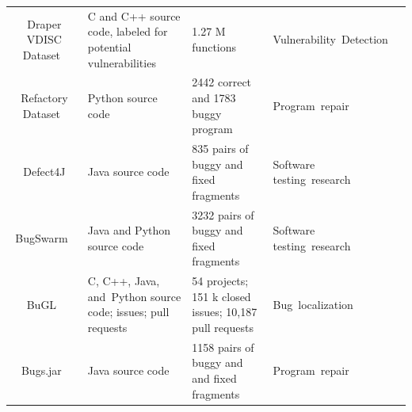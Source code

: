 \documentclass[mathematics,review,accept,moreauthors,pdftex]{Definitions/mdpi}
\begin{document}
\begin{specialtable}[H]
\begin{tabulary}{\textwidth}{CLLLl}
Draper VDISC Dataset~\cite{RusselEtAl2018} & C and C++ source code, labeled for potential vulnerabilities & 1.27 M functions & Vulnerability~Detection \\
Refactory Dataset~\cite{yang2019refactory} & Python source code & 2442 correct and 1783 buggy program & Program~repair \\
\hbox{Defect4J}\cite{just2014defects4j} & Java source code & 835 pairs of buggy and fixed fragments & Software testing~research \\
BugSwarm~\cite{Tomassi2019bugswarm} & Java and Python source code & 3232 pairs of buggy and fixed fragments & Software testing~research \\
BuGL~\cite{muvva2020bugl} & C, C++, Java, and~Python source code; issues; pull requests & 54 projects; 151 k closed issues; 10,187 pull requests & Bug~localization \\
Bugs.jar~\cite{SahaEtAl2018bugsjar} & Java source code & 1158 pairs of buggy and and fixed fragments & Program~repair \\
\bottomrule
\end{tabulary}
\end{specialtable}
\end{document}
